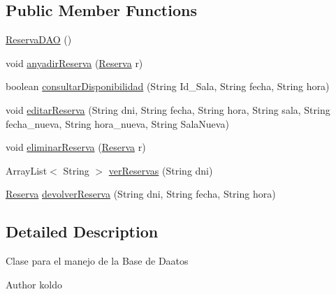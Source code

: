 \subsection*{Public Member Functions}
\begin{DoxyCompactItemize}
\item 
\mbox{\hyperlink{classes_1_1deusto_1_1spq_1_1biblioteca_1_1dao_1_1_reserva_d_a_o_a8de035b3d3826476934a2dd138f5e10b}{Reserva\+D\+AO}} ()
\item 
void \mbox{\hyperlink{classes_1_1deusto_1_1spq_1_1biblioteca_1_1dao_1_1_reserva_d_a_o_ab4d4780399982bd5241fc772664e26a3}{anyadir\+Reserva}} (\mbox{\hyperlink{classes_1_1deusto_1_1spq_1_1biblioteca_1_1data_1_1_reserva}{Reserva}} r)
\item 
boolean \mbox{\hyperlink{classes_1_1deusto_1_1spq_1_1biblioteca_1_1dao_1_1_reserva_d_a_o_a906df34a8711fd59536fc860bf3ef203}{consultar\+Disponibilidad}} (String Id\+\_\+\+Sala, String fecha, String hora)
\item 
void \mbox{\hyperlink{classes_1_1deusto_1_1spq_1_1biblioteca_1_1dao_1_1_reserva_d_a_o_a88e9785413691dee23241ef307b4e93d}{editar\+Reserva}} (String dni, String fecha, String hora, String sala, String fecha\+\_\+nueva, String hora\+\_\+nueva, String Sala\+Nueva)
\item 
void \mbox{\hyperlink{classes_1_1deusto_1_1spq_1_1biblioteca_1_1dao_1_1_reserva_d_a_o_a82fb1dbc3f6715103dea1b3bfb3d66b0}{eliminar\+Reserva}} (\mbox{\hyperlink{classes_1_1deusto_1_1spq_1_1biblioteca_1_1data_1_1_reserva}{Reserva}} r)
\item 
Array\+List$<$ String $>$ \mbox{\hyperlink{classes_1_1deusto_1_1spq_1_1biblioteca_1_1dao_1_1_reserva_d_a_o_a553798fbb62f35db87554e0b431f527b}{ver\+Reservas}} (String dni)
\item 
\mbox{\hyperlink{classes_1_1deusto_1_1spq_1_1biblioteca_1_1data_1_1_reserva}{Reserva}} \mbox{\hyperlink{classes_1_1deusto_1_1spq_1_1biblioteca_1_1dao_1_1_reserva_d_a_o_a84d61d9c1fbd0a2c7a17107354b6169e}{devolver\+Reserva}} (String dni, String fecha, String hora)
\end{DoxyCompactItemize}


\subsection{Detailed Description}
Clase para el manejo de la Base de Daatos \begin{DoxyAuthor}{Author}
koldo 
\end{DoxyAuthor}


